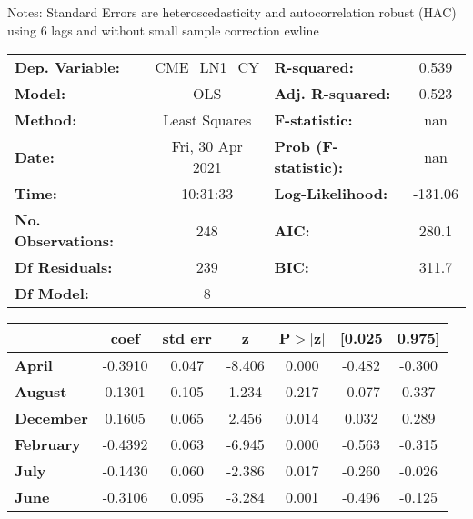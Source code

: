 Notes: \newline
 [1] Standard Errors are heteroscedasticity and autocorrelation robust (HAC) using 6 lags and without small sample correction
ewline\begin{center}
\begin{tabular}{lclc}
\toprule
\textbf{Dep. Variable:}    &   CME\_LN1\_CY   & \textbf{  R-squared:         } &     0.539   \\
\textbf{Model:}            &       OLS        & \textbf{  Adj. R-squared:    } &     0.523   \\
\textbf{Method:}           &  Least Squares   & \textbf{  F-statistic:       } &       nan   \\
\textbf{Date:}             & Fri, 30 Apr 2021 & \textbf{  Prob (F-statistic):} &      nan    \\
\textbf{Time:}             &     10:31:33     & \textbf{  Log-Likelihood:    } &   -131.06   \\
\textbf{No. Observations:} &         248      & \textbf{  AIC:               } &     280.1   \\
\textbf{Df Residuals:}     &         239      & \textbf{  BIC:               } &     311.7   \\
\textbf{Df Model:}         &           8      & \textbf{                     } &             \\
\bottomrule
\end{tabular}
\begin{tabular}{lcccccc}
                  & \textbf{coef} & \textbf{std err} & \textbf{z} & \textbf{P$> |$z$|$} & \textbf{[0.025} & \textbf{0.975]}  \\
\midrule
\textbf{April}    &      -0.3910  &        0.047     &    -8.406  &         0.000        &       -0.482    &       -0.300     \\
\textbf{August}   &       0.1301  &        0.105     &     1.234  &         0.217        &       -0.077    &        0.337     \\
\textbf{December} &       0.1605  &        0.065     &     2.456  &         0.014        &        0.032    &        0.289     \\
\textbf{February} &      -0.4392  &        0.063     &    -6.945  &         0.000        &       -0.563    &       -0.315     \\
\textbf{July}     &      -0.1430  &        0.060     &    -2.386  &         0.017        &       -0.260    &       -0.026     \\
\textbf{June}     &      -0.3106  &        0.095     &    -3.284  &         0.001        &       -0.496    &       -0.125     \\

\end{tabular}
\end{center}
